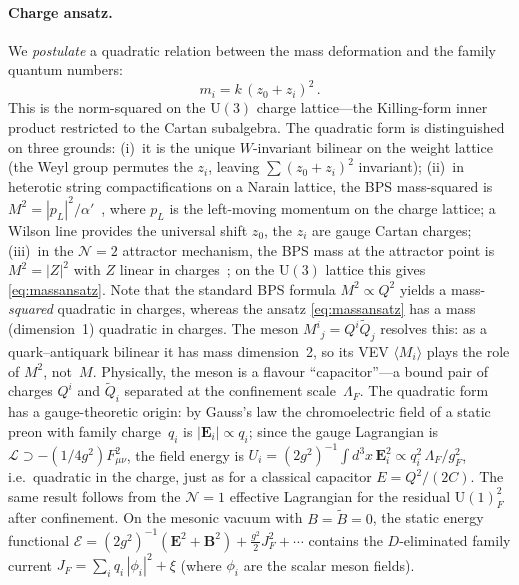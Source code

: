 \documentclass[12pt,a4paper]{article}
\newcommand{\UU}{\mathrm{U}}
\begin{document}
\paragraph{Charge ansatz.}
We \emph{postulate} a quadratic relation between the mass deformation
and the family quantum numbers:
\begin{equation}
  m_i = k\,(z_0 + z_i)^2\,.
  \label{eq:massansatz}
\end{equation}
This is the norm-squared on the $\UU(3)$ charge lattice---the
Killing-form inner product restricted to the Cartan subalgebra.
The quadratic form is distinguished on three grounds:
(i)~it is the unique $W$-invariant bilinear on the
weight lattice (the Weyl group permutes the $z_i$, leaving
$\sum(z_0 + z_i)^2$ invariant);
(ii)~in heterotic string compactifications on a Narain lattice,
the BPS mass-squared is
$M^2 = |p_L|^2/\alpha'$~\cite{Narain:1986}, where $p_L$ is the
left-moving momentum on the charge lattice; a Wilson line provides
the universal shift $z_0$, the $z_i$ are gauge Cartan charges;
(iii)~in the $\mathcal{N}=2$ attractor mechanism, the BPS mass
at the attractor point is $M^2 = |Z|^2$ with $Z$ linear in
charges~\cite{Ferrara:1995ih}; on the $\UU(3)$ lattice this
gives \eqref{eq:massansatz}.
Note that the standard BPS formula $M^2 \propto Q^2$ yields a
mass-\emph{squared} quadratic in charges, whereas the ansatz
\eqref{eq:massansatz} has a mass (dimension~1) quadratic in charges.
The meson $M^i{}_j = Q^i\tilde{Q}_j$ resolves this: as a
quark--antiquark bilinear it has mass dimension~2, so its
VEV $\langle M_i\rangle$ plays the role of $M^2$, not~$M$.
Physically, the meson is a flavour ``capacitor''---a bound pair
of charges $Q^i$ and $\tilde{Q}_i$ separated at the confinement
scale~$\Lambda_F$.  The quadratic form has a gauge-theoretic origin:
by Gauss's law the chromoelectric field of a static preon with
family charge~$q_i$ is $|\mathbf{E}_i| \propto q_i$; since
the gauge Lagrangian is $\mathcal{L} \supset -(1/4g^2)F_{\mu\nu}^2$,
the field energy is $U_i = (2g^2)^{-1}\!\int\!d^3x\,\mathbf{E}_i^2
\propto q_i^2\,\Lambda_F/g_F^2$,
i.e.\ quadratic in the charge, just as for a classical capacitor
$E = Q^2/(2C)$.
The same result follows from the $\mathcal{N}=1$ effective
Lagrangian for the residual $\UU(1)^2_F$ after confinement.
On the mesonic vacuum with $B = \tilde{B} = 0$, the
static energy functional
$\mathcal{E} = (2g^2)^{-1}(\mathbf{E}^2{+}\mathbf{B}^2)
+ \tfrac{g^2}{2}J_F^2 + \cdots$ contains the $D$-eliminated
family current $J_F = \sum_i q_i\,|\phi_i|^2 + \xi$
(where $\phi_i$ are the scalar meson fields).
\end{document}
